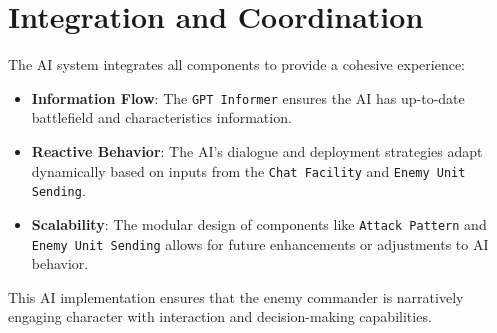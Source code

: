 \section{Integration and Coordination}
The AI system integrates all components to provide a cohesive experience:
\begin{itemize}
    \item \textbf{Information Flow}: The \texttt{GPT Informer} ensures the AI has up-to-date battlefield and characteristics information.
    \item \textbf{Reactive Behavior}: The AI's dialogue and deployment strategies adapt dynamically based on inputs from the \texttt{Chat Facility} and \texttt{Enemy Unit Sending}.
    \item \textbf{Scalability}: The modular design of components like \texttt{Attack Pattern} and \texttt{Enemy Unit Sending} allows for future enhancements or adjustments to AI behavior.
\end{itemize}

This AI implementation ensures that the enemy commander is narratively engaging character with interaction and decision-making capabilities.
